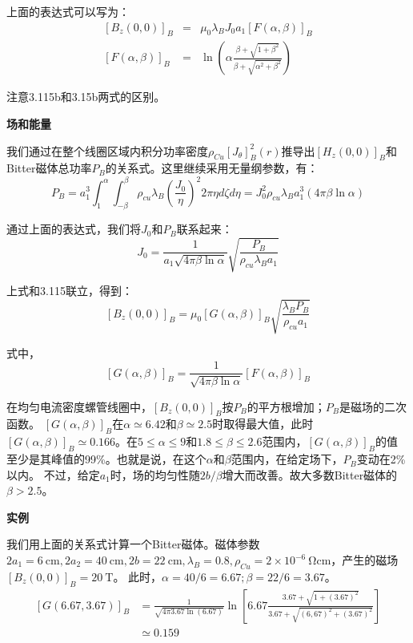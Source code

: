 上面的表达式可以写为：
\begin{eqnarray}
{[B_z(0,0)]}_B&=&\mu_0\lambda_B J_0a_1[F(\alpha,\beta)]_B\\ %
{[F(\alpha,\beta)]}_B&=&\ln\left(\alpha\frac{\beta+\sqrt{1+\beta^2}}{\beta+\sqrt{\alpha^2+\beta^2}}\right)%
\end{eqnarray}

注意3.115b和3.15b两式的区别。

\textbf{场和能量}

我们通过在整个线圈区域内积分功率密度$\rho_{Cu} [J_\theta]_B^2(r)$推导出$[H_z(0,0)]_B$和Bitter磁体总功率$P_B$的关系式。这里继续采用无量纲参数，有：
\begin{equation}
P_B=a_1^3\int_{1}^{\alpha}\int_{-\beta}^{\beta}\rho_{cu}\lambda_B\left(\frac{J_0}{\eta}\right)^2 2\pi\eta d\zeta d\eta=J_0^2\rho_{cu}\lambda_B a_1^3(4\pi\beta\ln\alpha)%
\end{equation}

通过上面的表达式，我们将$J_0$和$P_B$联系起来：
\begin{equation}
J_0=\frac{1}{a_1\sqrt{4\pi\beta\ln\alpha}}\sqrt{\frac{P_B}{\rho_{cu}\lambda_B a_1}}%
\end{equation}

上式和3.115联立，得到：
\begin{equation}
{[B_z(0,0)]}_B=\mu_0[G(\alpha,\beta)]_B\sqrt{\frac{\lambda_B P_B}{\rho_{cu}a_1}}%
\end{equation}

式中，
\begin{equation}
{[G(\alpha,\beta)]}_B=\frac{1}{\sqrt{4\pi\beta\ln\alpha}}[F(\alpha,\beta)]_B%
\end{equation}

在均匀电流密度螺管线圈中，$[B_z(0,0)]_B$按$P_B$的平方根增加；$P_B$是磁场的二次函数。
$[G(\alpha,\beta)]_B$在$\alpha\simeq 6.42$和$\beta\simeq 2.5$时取得最大值，此时$[G(\alpha,\beta)]_B\simeq 0.166$。在$5\leq \alpha \leq 9$和$1.8\leq\beta\leq 2.6$范围内，$[G(\alpha,\beta)]_B$的值
至少是其峰值的99\%。也就是说，在这个$\alpha$和$\beta$范围内，在给定场下，$P_B$变动在2\%以内。
不过，给定$a_1$时，场的均匀性随$2b/\beta$增大而改善。故大多数Bitter磁体的$\beta>2.5$。

\textbf{实例}

我们用上面的关系式计算一个Bitter磁体。磁体参数$2a_1=6\ \mathrm{cm}, 2a_2=40\ \mathrm{cm}, 2b=22 \ \mathrm{cm},\lambda_B=0.8, \rho_{Cu}=2\times10^{-6}\ \mathrm{\Omega cm}$，产生的磁场$[B_z(0,0)]_B=20\ \mathrm{T}$。
此时，$\alpha=40/6=6.67;\beta=22/6=3.67$。
\begin{equation}
\begin{split}
{[G(6.67,3.67)]}_B&=\frac{1}{\sqrt{4\pi3.67\ln(6.67)}}\ln\left[6.67\frac{3.67+\sqrt{1+(3.67)^2}}{3.67+\sqrt{(6,67)^2+(3.67)^2}}\right]\\
&\simeq 0.159 %
\end{split}
\end{equation}

